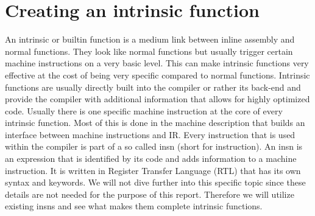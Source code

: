 \chapter{Creating an intrinsic function}
\label{chapter:builtins}

An intrinsic or builtin function is a medium link between inline assembly and normal functions. They look like normal functions but usually trigger certain machine instructions on a very basic level. This can make intrinsic functions very effective at the cost of being very specific compared to normal functions. Intrinsic functions are usually directly built into the compiler or rather its back-end and provide the compiler with additional information that allows for highly optimized code. Usually there is one specific machine instruction at the core of every intrinsic function.
Most of this is done in the machine description that builds an interface between machine instructions and IR. Every instruction that is used within the compiler is part of a so called insn (short for instruction). An insn is an expression that is identified by its code and adds information to a machine instruction. It is written in Register Transfer Language (RTL) that has its own syntax and keywords.
We will not dive further into this specific topic since these details are not needed for the purpose of this report. Therefore we will utilize existing insns and see what makes them complete intrinsic functions.

